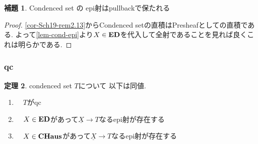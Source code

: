 \documentclass[dvipdfmx,a4paper,11pt]{article}
\theoremstyle{definition}
\newtheorem{thm}{定理}
\newtheorem{lem}[thm]{補題}
\begin{document}
 

 \begin{tcolorbox}
 [colback = white, colframe = green!35!black, fonttitle = \bfseries,breakable = true]
  \begin{lem}\cite[Lemma 3.6.2]{Bar22}
\label{lem-ep-pullback}
Condenced set の epi射はpullbackで保たれる
  \end{lem}
  \end{tcolorbox}
 \begin{proof}
 \ref{cor-Sch19-rem2.13}からCondenced setの直積はPresheafとしての直積である.
 よって\ref{lem-cond-epi}より$X \in {\bf ED}$を代入して全射であることを見れば良くこれは明らかである.
 \end{proof}

 \subsubsection{qc}
   \begin{tcolorbox}
 [colback = white, colframe = green!35!black, fonttitle = \bfseries,breakable = true]
 \begin{thm}\cite[Proposition 4.11.11]{Bar22}
 \label{thm-qc-represent}
condenced set $T$について 以下は同値.
 \begin{enumerate}
 \item　$T$がqc
 \item　$X \in {\bf ED}$があって$\underline{X}\to T$なるepi射が存在する
 \item　$X \in {\bf CHaus}$があって$\underline{X}\to T$なるepi射が存在する
 \end{enumerate}
 \end{thm}
 \end{tcolorbox}
 
\end{document}
